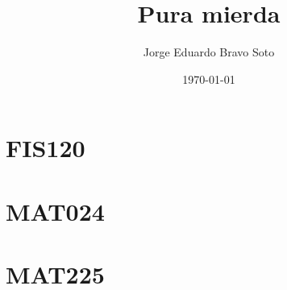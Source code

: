 \documentclass{article}
\title{Pura mierda}
\author{Jorge Eduardo Bravo Soto}
\date{\today}
\theoremstyle{definition}
\begin{document}
\maketitle
\tableofcontents

\section{FIS120}


\section{MAT024}


\section{MAT225}

\end{document}
